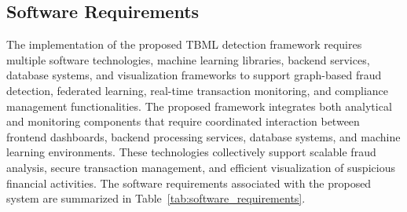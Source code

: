 \subsection[Software Requirements]{\textbf{Software Requirements}}

The implementation of the proposed TBML detection framework requires multiple software technologies, machine learning libraries, backend services, database systems, and visualization frameworks to support graph-based fraud detection, federated learning, real-time transaction monitoring, and compliance management functionalities. The proposed framework integrates both analytical and monitoring components that require coordinated interaction between frontend dashboards, backend processing services, database systems, and machine learning environments. These technologies collectively support scalable fraud analysis, secure transaction management, and efficient visualization of suspicious financial activities. The software requirements associated with the proposed system are summarized in Table~\ref{tab:software_requirements}.
\vspace{0.3cm}

\footnotesize
\renewcommand{\arraystretch}{1.5}

